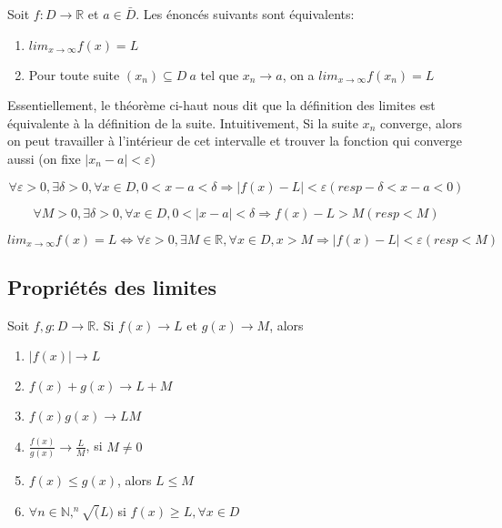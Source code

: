 \documentclass{article}
\begin{document}
\begin{problem}
\end{problem}

\begin{theorem}
    Soit $f:D \rightarrow \mathbb{R}$ et $a \in \bar{D}$. Les énoncés
    suivants sont équivalents:
    \begin{enumerate}
	\item $lim_{x \to \infty} f(x)=L$
	\item Pour toute suite $(x_n) \subseteq D \ {a}$ tel que
	    $x_n \to a$, on a $lim_{x \to \infty} f(x_n)=L$
    \end{enumerate}
\end{theorem}

\begin{intuition}
    Essentiellement, le théorème ci-haut nous dit que la définition des
    limites est équivalente à la définition de la suite. Intuitivement,
    Si la suite $x_n$ converge, alors on peut travailler à l'intérieur
    de cet intervalle et trouver la fonction qui converge aussi (on
    fixe $|x_n -a|<\varepsilon$)
\end{intuition}

\begin{definition}
    $$ \forall \varepsilon > 0, \exists \delta > 0, \forall x \in D,
    0 < x-a < \delta \Longrightarrow |f(x)-L|< \varepsilon (resp
    -\delta < x-a <0)$$
\end{definition}

\begin{definition}
    $$ \forall M > 0, \exists \delta > 0, \forall x \in D,
    0 < |x-a| < \delta \Longrightarrow f(x)-L > M (resp <M)$$
\end{definition}

\begin{definition}
    $$ lim_{x \to \infty} f(x)=L \Longleftrightarrow \forall \varepsilon >0,
    \exists M \in \mathbb{R}, \forall x \in D, x >M \Longrightarrow
    |f(x) -L|< \varepsilon (resp <M)$$
\end{definition}

\subsection{Propriétés des limites}

\begin{theorem}
    Soit $f,g:D \to \mathbb{R}$. Si $f(x) \to L$ et $g(x) \to M$, alors
    \begin{enumerate}
	\item $ |f(x)| \to L$
	\item $ f(x) + g(x) \to L+M$
	\item $ f(x) g(x) \to LM$
	\item $ \frac{f(x)}{g(x)} \to \frac{L}{M}$, si $M \neq 0$
	\item $ f(x) \leq g(x)$, alors $L \leq M$
	\item $ \forall n \in \mathbb{N}, ^n\sqrt(L)$ si $f(x) \geq
	    L, \forall x \in D$
    \end{enumerate}
\end{theorem}
\end{document}
